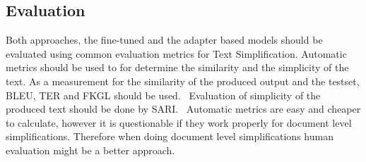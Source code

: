 \subsection{Evaluation}
Both approaches, the fine-tuned and the adapter based models should be evaluated
using common evaluation metrics for Text Simplification.
Automatic metrics should be used to for determine the similarity and the simplicity of the text.
As a measurement for the similarity of the produced output and the testset, BLEU, TER and FKGL should be used.~\cite{AlvaManchego2020}
Evaluation of simplicity of the produced text should be done by SARI.~\cite{AlvaManchego2020}
Automatic metrics are easy and cheaper to calculate, however it is questionable if they work properly for document level
simplifications. Therefore when doing document level simplifications human evaluation might be a better approach.